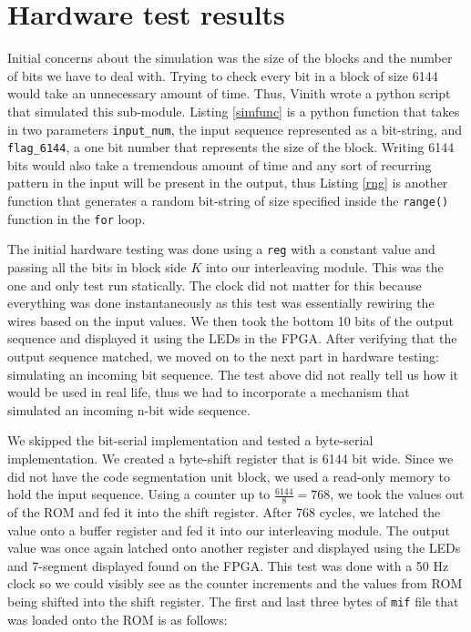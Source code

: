 \documentclass[letterpaper, 12pt]{article} %
\begin{document}
\section{Hardware test results}
Initial concerns about the simulation was the size of the blocks and the number of bits we have to deal with. Trying to check every bit in a block of size 6144 would take an unnecessary amount of time. Thus, Vinith wrote a python script that simulated this sub-module. Listing \ref{simfunc} is a python function that takes in two parameters \texttt{input\_num}, the input sequence represented as a bit-string, and \texttt{flag\_6144}, a one bit number that represents the size of the block. Writing 6144 bits would also take a tremendous amount of time and any sort of recurring pattern in the input will be present in the output, thus Listing \ref{rng} is another function that generates a random bit-string of size specified inside the \texttt{range()} function in the \texttt{for} loop.\par
The initial hardware testing was done using a \texttt{reg} with a constant value and passing all the bits in block side $K$ into our interleaving module. This was the one and only test run statically. The clock did not matter for this because everything was done instantaneously as this test was essentially rewiring the wires based on the input values. We then took the bottom 10 bits of the output sequence and displayed it using the LEDs in the FPGA. After verifying that the output sequence matched, we moved on to the next part in hardware testing: simulating an incoming bit sequence. The test above did not really tell us how it would be used in real life, thus we had to incorporate a mechanism that simulated an incoming n-bit wide sequence. \par
We skipped the bit-serial implementation and tested a byte-serial implementation. We created a byte-shift register that is 6144 bit wide. Since we did not have the code segmentation unit block, we used a read-only memory to hold the input sequence. Using a counter up to $\frac{6144}{8} = 768$, we took the values out of the ROM and fed it into the shift register. After 768 cycles, we latched the value onto a buffer register and fed it into our interleaving module. The output value was once again latched onto another register and displayed using the LEDs and 7-segment displayed found on the FPGA. This test was done with a 50 Hz clock so we could visibly see as the counter increments and the values from ROM being shifted into the shift register. The first and last three bytes of \texttt{mif} file that was loaded onto the ROM is as follows:
\end{document}
